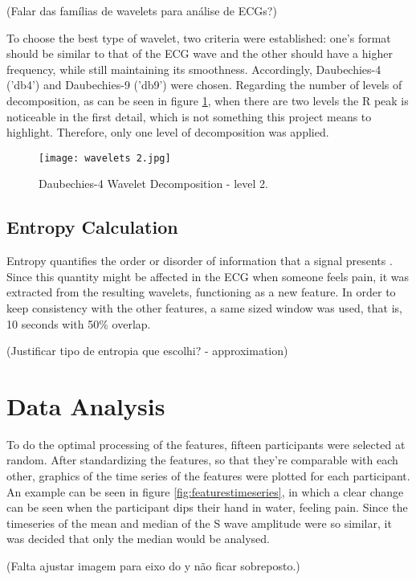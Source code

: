 (Falar das famílias de wavelets para análise de ECGs?)

To choose the best type of wavelet, two criteria were established: one's format should be similar to that of the ECG wave and the other should have a higher frequency, while still maintaining its smoothness.
Accordingly, Daubechies-4 ('db4') and Daubechies-9 ('db9') were chosen.
Regarding the number of levels of decomposition, as can be seen in figure \ref{fig:wavelets2}, when there are two levels the R peak is noticeable in the first detail, which is not something this project means to highlight.
Therefore, only one level of decomposition was applied.

\begin{figure}[h!]
    \centering
    \texttt{[image: wavelets 2.jpg]}
    \caption{Daubechies-4 Wavelet Decomposition - level 2.}
    \label{fig:wavelets2}
\end{figure}


\subsection{Entropy Calculation}
Entropy quantifies the order or disorder of information that a signal presents \cite{Ferreira2017}. Since this quantity might be affected in the ECG when someone feels pain, it was extracted from the resulting wavelets, functioning as a new feature. In order to keep consistency with the other features, a same sized window was used, that is, 10 seconds with 50\% overlap. 

(Justificar tipo de entropia que escolhi? - approximation)




\section{Data Analysis}
To do the optimal processing of the features, fifteen participants were selected at random. After standardizing the features, so that they're comparable with each other, graphics of the time series of the features were plotted for each participant. An example can be seen in figure \ref{fig:featurestimeseries}, in which a clear change can be seen when the participant dips their hand in water, feeling pain. Since the timeseries of the mean and median of the S wave amplitude were so similar, it was decided that only the median would be analysed.

(Falta ajustar imagem para eixo do y não ficar sobreposto.)

